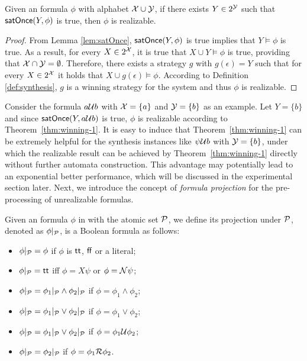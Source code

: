 \begin{theorem}\label{thm:winning-1}
Given an \ltlf formula $\phi$ with alphabet $\X\cup \Y$, if there exists $Y\in 2^{\Y}$ such that $\satOnce (Y, \phi)$ is true, then $\phi$ is realizable. 
\end{theorem}
\begin{proof}
From Lemma \ref{lem:satOnce}, $\satOnce (Y, \phi)$ is true implies that $Y\models\phi$ is true. As a result, for every $X\in 2^{\X}$, it is true that $X\cup Y\models\phi$ is true, providing that $\X\cap \Y=\emptyset$. Therefore, there exists a strategy $g$ with $g(\epsilon) = Y$ such that for every $X\in 2^{\X}$ it holds that $X\cup g(\epsilon)\models\phi$. According to Definition \ref{def:synthesis}, $g$ is a winning strategy for the system and thus $\phi$ is realizable.
\end{proof}

Consider the formula $a\U b$ with $\X=\{a\}$ and $\Y=\{b\}$ as an example. Let $Y= \{b\}$ and since $\satOnce (Y, a\U b)$ is true, $\phi$ is realizable according to Theorem~\ref{thm:winning-1}. It is easy to induce that Theorem~\ref{thm:winning-1} can be extremely helpful for the synthesis instances like $\psi\U b$ with $\Y=\{b\}$, under which the realizable result can be achieved by Theorem~\ref{thm:winning-1} directly without further automata construction. This advantage may potentially lead to an exponential better performance, which will be discussed in the experimental section later. Next, we introduce the concept of \emph{formula projection} for the pre-processing of unrealizable formulas. 

\begin{definition}\label{def:fp}
Given an \ltlf formula $\phi$ in \NNF with the atomic set $\P$, we define its projection under $\P$, denoted as $\phi |_\P$, is a Boolean formula as follows:
\begin{itemize}
	\item $\phi|_\P = \phi$ if $\phi$ is $\tt$, $\ff$ or a literal;
	\item $\phi|_\P = \tt$ iff $\phi = X\psi$ or $\phi = \N\psi$;
	\item $\phi|_\P = \phi_1|_\P \wedge \phi_2|_\P$ if $\phi = \phi_1\wedge\phi_2$;
	\item $\phi|_\P = \phi_1|_\P \vee \phi_2|_\P$ if $\phi = \phi_1\vee\phi_2$;
	\item $\phi|_\P = \phi_1|_\P \vee \phi_2|_\P$ if $\phi = \phi_1\U\phi_2$;
	\item $\phi|_\P = \phi_2|_\P$ if $\phi = \phi_1\R\phi_2$.
\end{itemize}
\end{definition}

